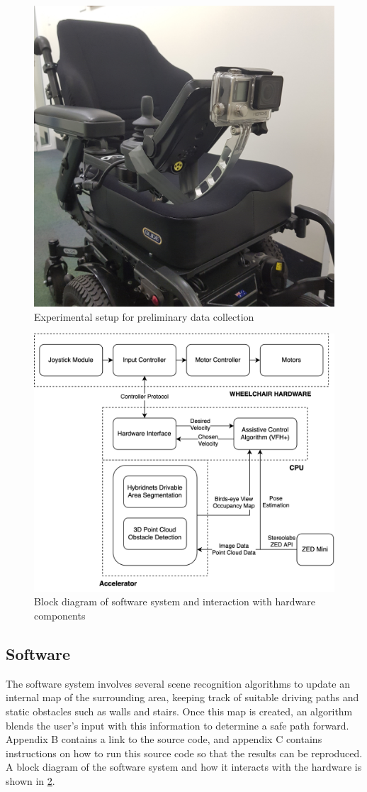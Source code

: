 \begin{figure}[p]
    \centering
    \includegraphics[width=0.45\linewidth,angle=270,origin=c]{images/gopro_dataset_collection.jpg}
    \caption{Experimental setup for preliminary data collection}
    \label{fig:gopro_dataset_collection}
\end{figure}

\begin{figure}[p]
    \centering
    \includegraphics[width=0.8\linewidth]{images/block_diagram.png}
    \caption{Block diagram of software system and interaction with hardware components}
    \label{fig:block_diagram}
\end{figure}\clearpage

\subsection{Software}
The software system involves several scene recognition algorithms to update an internal
map of the surrounding area, keeping track of suitable driving paths and static obstacles
such as walls and stairs. Once this map is created, an algorithm blends the
user's input with this information to determine a safe path forward.
Appendix B contains a link to the source code, and appendix C contains
instructions on how to run this source code so that the results can be reproduced.
A block diagram of the software system
and how it interacts with the hardware is shown in \cref{fig:block_diagram}.

